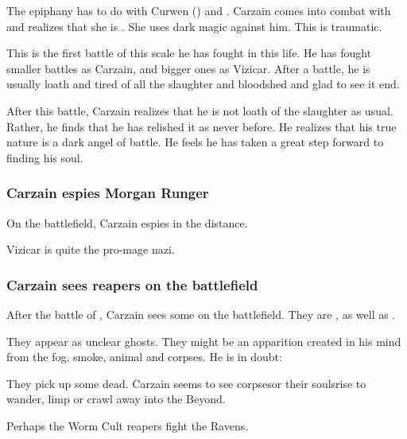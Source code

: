 The epiphany has to do with Curwen () and \Takestsha.
Carzain comes into combat with \Takestsha and realizes that she is \Nzessuacrith. 
She uses dark magic against him. 
This is traumatic. 

This is the first battle of this scale he has fought in this life.
He has fought smaller battles as Carzain, and bigger ones as Vizicar.
After a battle, he is usually loath and tired of all the slaughter and bloodshed and glad to see it end. 

After this battle, Carzain realizes that he is not loath of the slaughter as usual.
Rather, he finds that he has relished it as never before. 
He realizes that his true nature is a dark angel of battle.
He feels he has taken a great step forward to finding his soul. 





\subsubsection{Carzain espies Morgan Runger}
On the battlefield, Carzain espies  in the distance. 


Vizicar is quite the pro-mage nazi. 







\subsubsection{Carzain sees reapers on the battlefield}
After the battle of \Forclin, Carzain sees some  on the battlefield. They are , as well as . 

They appear as unclear ghosts. They might be an apparition created in his mind from the fog, smoke, animal and corpses. He is in doubt: 

They pick up some dead. Carzain seems to see corpses\dash or their souls\dash rise to wander, limp or crawl away into the Beyond. 

Perhaps the Worm Cult reapers fight the Ravens. 






